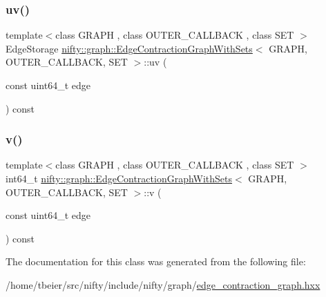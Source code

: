 \mbox{\label{classnifty_1_1graph_1_1EdgeContractionGraphWithSets_a0edbec99d4a3354b0f507d0f59d89c77}} 
\subsubsection{\texorpdfstring{uv()}{uv()}}
{\footnotesize\ttfamily template$<$class G\+R\+A\+PH , class O\+U\+T\+E\+R\+\_\+\+C\+A\+L\+L\+B\+A\+CK , class S\+ET $>$ \\
Edge\+Storage \hyperlink{classnifty_1_1graph_1_1EdgeContractionGraphWithSets}{nifty\+::graph\+::\+Edge\+Contraction\+Graph\+With\+Sets}$<$ G\+R\+A\+PH, O\+U\+T\+E\+R\+\_\+\+C\+A\+L\+L\+B\+A\+CK, S\+ET $>$\+::uv (\begin{DoxyParamCaption}\item[{const uint64\+\_\+t}]{edge }\end{DoxyParamCaption}) const\hspace{0.3cm}{\ttfamily [inline]}}

\mbox{\label{classnifty_1_1graph_1_1EdgeContractionGraphWithSets_aeeb13117bb87989a9ace9f571b73ebca}} 
\subsubsection{\texorpdfstring{v()}{v()}}
{\footnotesize\ttfamily template$<$class G\+R\+A\+PH , class O\+U\+T\+E\+R\+\_\+\+C\+A\+L\+L\+B\+A\+CK , class S\+ET $>$ \\
int64\+\_\+t \hyperlink{classnifty_1_1graph_1_1EdgeContractionGraphWithSets}{nifty\+::graph\+::\+Edge\+Contraction\+Graph\+With\+Sets}$<$ G\+R\+A\+PH, O\+U\+T\+E\+R\+\_\+\+C\+A\+L\+L\+B\+A\+CK, S\+ET $>$\+::v (\begin{DoxyParamCaption}\item[{const uint64\+\_\+t}]{edge }\end{DoxyParamCaption}) const\hspace{0.3cm}{\ttfamily [inline]}}



The documentation for this class was generated from the following file\+:\begin{DoxyCompactItemize}
\item 
/home/tbeier/src/nifty/include/nifty/graph/\hyperlink{graph_2edge__contraction__graph_8hxx}{edge\+\_\+contraction\+\_\+graph.\+hxx}\end{DoxyCompactItemize}
